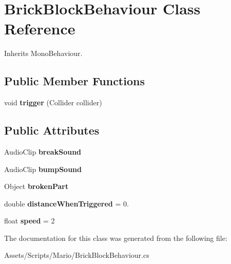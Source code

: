 \hypertarget{class_brick_block_behaviour}{\section{Brick\-Block\-Behaviour Class Reference}
\label{class_brick_block_behaviour}
}


Inherits Mono\-Behaviour.

\subsection*{Public Member Functions}
\begin{DoxyCompactItemize}
\item 
\hypertarget{class_brick_block_behaviour_ab1edc86a4e6101b82d9c1761deed1c75}{void {\bfseries trigger} (Collider collider)}\label{class_brick_block_behaviour_ab1edc86a4e6101b82d9c1761deed1c75}

\end{DoxyCompactItemize}
\subsection*{Public Attributes}
\begin{DoxyCompactItemize}
\item 
\hypertarget{class_brick_block_behaviour_a3b2a554c1fb3db9e3cbc88ae2ae60ecb}{Audio\-Clip {\bfseries break\-Sound}}\label{class_brick_block_behaviour_a3b2a554c1fb3db9e3cbc88ae2ae60ecb}

\item 
\hypertarget{class_brick_block_behaviour_aef662cff3206571b291640c3283679ae}{Audio\-Clip {\bfseries bump\-Sound}}\label{class_brick_block_behaviour_aef662cff3206571b291640c3283679ae}

\item 
\hypertarget{class_brick_block_behaviour_a1d754535ab0c20145a58bca029a4111f}{Object {\bfseries broken\-Part}}\label{class_brick_block_behaviour_a1d754535ab0c20145a58bca029a4111f}

\item 
\hypertarget{class_brick_block_behaviour_a40aa5689e5e9f7b2629490074c0b3ece}{double {\bfseries distance\-When\-Triggered} = 0.}\label{class_brick_block_behaviour_a40aa5689e5e9f7b2629490074c0b3ece}

\item 
\hypertarget{class_brick_block_behaviour_ab90630ebc8718a8fdee2d0c20c509dca}{float {\bfseries speed} = 2}\label{class_brick_block_behaviour_ab90630ebc8718a8fdee2d0c20c509dca}

\end{DoxyCompactItemize}


The documentation for this class was generated from the following file\-:\begin{DoxyCompactItemize}
\item 
Assets/\-Scripts/\-Mario/Brick\-Block\-Behaviour.\-cs\end{DoxyCompactItemize}

